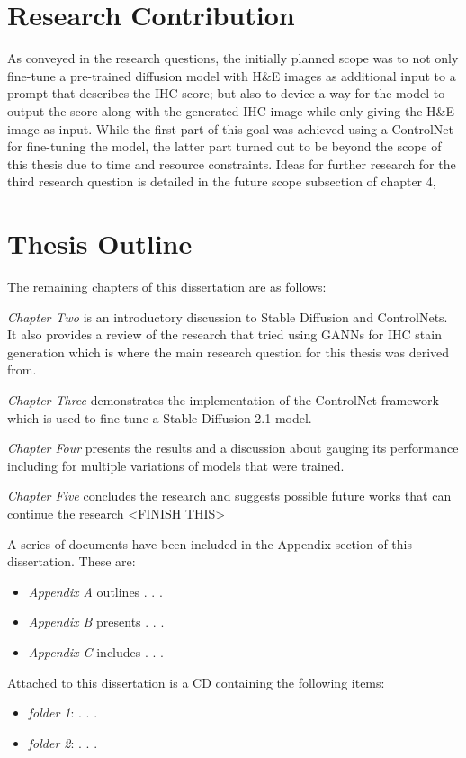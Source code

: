 \section{Research Contribution}

As conveyed in the research questions, the initially planned scope was to not only fine-tune a pre-trained diffusion model with H\&E images as additional input to a prompt that describes the IHC score; but also to device a way for the model to output the score along with the generated IHC image while only giving the H\&E image as input. While the first part of this goal was achieved using a ControlNet \parencite{Zhang2023AddingModels} for fine-tuning the model, the latter part turned out to be beyond the scope of this thesis due to time and resource constraints. Ideas for further research for the third research question is detailed in the future scope subsection of chapter 4, 

\section{Thesis Outline} 

The remaining chapters of this dissertation are as follows:


\emph{Chapter Two} is an introductory discussion to Stable Diffusion and ControlNets. It also provides a review of the research that tried using GANNs for IHC stain generation which is where the main research question for this thesis was derived from. 

\emph{Chapter Three} demonstrates the implementation of the ControlNet framework which is used to fine-tune a Stable Diffusion 2.1 model.

\emph{Chapter Four} presents the results and a discussion about gauging its performance including for multiple variations of models that were trained.

\emph{Chapter Five} concludes the research and suggests possible future works that can continue the research <FINISH THIS>

\vspace{5 mm}

A series of documents have been included in the Appendix section of this dissertation. These are:

\begin{itemize}
\item \emph{Appendix A} outlines . . .

\item \emph{Appendix B} presents . . .

\item \emph{Appendix C} includes . . .
\end{itemize} 

\vspace{5 mm}

Attached to this dissertation is a CD containing the following items:

\begin{itemize}
\item \emph{folder 1}: . . .

\item \emph{folder 2}: . . .

\end{itemize}





